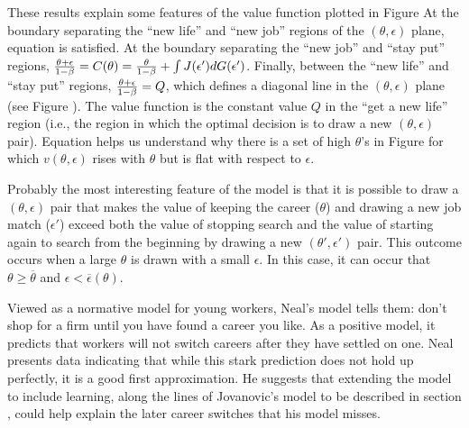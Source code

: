 These results explain some features of the value function
plotted in Figure  %
  At the boundary separating
the ``new life'' and ``new job''  regions of the $(\theta, \epsilon)$
plane, equation  is satisfied.   At the boundary
separating   the ``new job'' and ``stay put'' regions,
$ {\theta + \epsilon \over 1 - \beta} =  C(\theta) =
{\theta \over 1-\beta} + \int J(\epsilon') d G(\epsilon')$.
Finally, between the ``new life'' and ``stay put'' regions,
${\theta + \epsilon \over 1 - \beta} = Q$, which defines
a diagonal line in the $(\theta, \epsilon)$ plane (see Figure
). %
  The value function
is the constant value $Q$
in the ``get a new life'' region (i.e., the region in which the optimal decision is to draw a new $(\theta,\epsilon)$
pair).   Equation  helps
us understand why there is a set of high $\theta$'s in Figure   %
for which $v(\theta,\epsilon)$ rises with $\theta$  but
is flat with respect to $\epsilon$.

  Probably the most interesting feature of the model is that it  is possible
to draw a $(\theta, \epsilon)$ pair that makes
the value of keeping the career ($\theta$) and drawing a new
job match   ($\epsilon'$) exceed both the value of
stopping search and the value of starting again to
search from the beginning by drawing a new $(\theta', \epsilon')$ pair.
This outcome  occurs when a large   $\theta$ is drawn with a small
$\epsilon$.  In this case, it can occur that  $\theta \geq \overline
 \theta$ and
$\epsilon < \overline \epsilon(\theta)$. 

  Viewed as a normative model for young workers, Neal's model tells them:
don't shop for a  firm  until you have found a career you like.
  As a positive model, it predicts that  workers   will not
switch careers after they have settled on one.   Neal presents
data indicating that while this stark prediction does not hold up perfectly, it
is a good first approximation.
He suggests that extending the model to include learning, along the
lines of Jovanovic's model to be described in section ,
could help  explain  the later career  switches that
his model misses.

